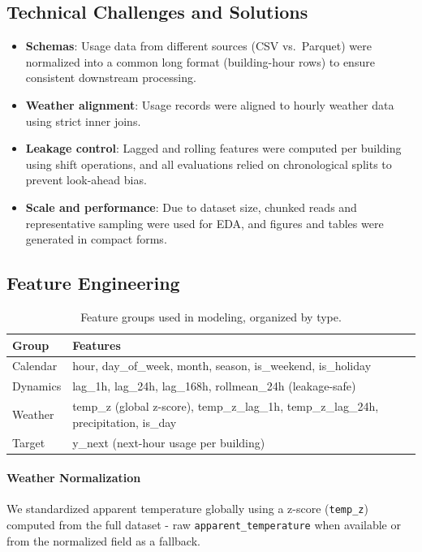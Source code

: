 \documentclass[11pt,a4paper]{article}
\begin{document}
\subsection{Technical Challenges and Solutions}
\begin{itemize}[leftmargin=*]
  \item \textbf{Schemas}: Usage data from different sources (CSV vs.\ Parquet) were normalized into a common long format (building-hour rows) to ensure consistent downstream processing.
  \item \textbf{Weather alignment}: Usage records were aligned to hourly weather data using strict inner joins.
  \item \textbf{Leakage control}: Lagged and rolling features were computed per building using shift operations, and all evaluations relied on chronological splits to prevent look-ahead bias.
  \item \textbf{Scale and performance}: Due to dataset size, chunked reads and representative sampling were used for EDA, and figures and tables were generated in compact forms.
\end{itemize}

\subsection{Feature Engineering}
\begin{table}[H]
  \centering
  \begin{tabular}{l p{10cm}}
    \hline
    Group & Features \\ \hline
    Calendar & hour, day\_of\_week, month, season, is\_weekend, is\_holiday \\
    Dynamics & lag\_1h, lag\_24h, lag\_168h, rollmean\_24h (leakage-safe) \\
    Weather & temp\_z (global z-score), temp\_z\_lag\_1h, temp\_z\_lag\_24h, precipitation, is\_day \\
    Target & y\_next (next-hour usage per building) \\
    \hline
  \end{tabular}
  \caption{Feature groups used in modeling, organized by type.}
\end{table}

\paragraph{Weather Normalization}
We standardized apparent temperature globally using a z-score (\texttt{temp\_z}) computed from the full dataset - raw \texttt{apparent\_temperature} when available or from the normalized field as a fallback.
\end{document}
